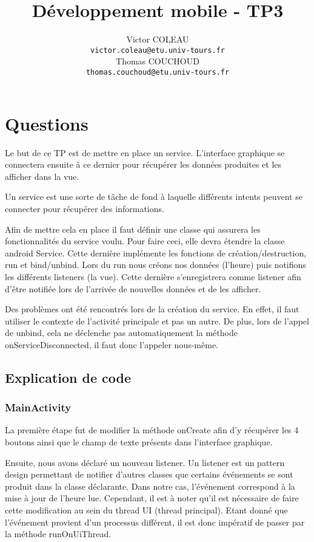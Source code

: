 \documentclass{report}
\title{Développement mobile - TP3}
\author{Victor COLEAU\\\texttt{victor.coleau@etu.univ-tours.fr}\\Thomas COUCHOUD\\\texttt{thomas.couchoud@etu.univ-tours.fr}}
\begin{document}
	\mccTitle
	
	\chapter{Questions}
		Le but de ce TP est de mettre en place un service. 
		L'interface graphique se connectera ensuite à ce dernier pour récupérer les données produites et les afficher dans la vue.
		
		Un service est une sorte de tâche de fond à laquelle différents intents peuvent se connecter pour récupérer des informations.
		
		Afin de mettre cela en place il faut définir une classe qui assurera les fonctionnalités du service voulu. 
		Pour faire ceci, elle devra étendre la classe android Service.
		Cette dernière implémente les fonctions de création/destruction, run et bind/unbind.
		Lors du run nous créons nos données (l'heure) puis notifions les différents listeners (la vue).
		Cette dernière s'enregistrera comme listener afin d'être notifiée lors de l'arrivée de nouvelles données et de les afficher.
		
		Des problèmes ont été rencontrés lors de la création du service.
		En effet, il faut utiliser le contexte de l'activité principale et pas un autre.
		De plus, lors de l'appel de unbind, cela ne déclenche pas automatiquement la méthode onServiceDisconnected, il faut donc l'appeler nous-même.

	\section{Explication de code}
		\subsection{MainActivity}
			La première étape fut de modifier la méthode onCreate afin d'y récupérer les 4 boutons ainsi que le champ de texte présents dans l'interface graphique.
	
			Ensuite, nous avons déclaré un nouveau listener.
			Un listener est un pattern design permettant de notifier d'autres classes que certains événements se sont produit dans la classe déclarante.
			Dans notre cas, l'événement correspond à la mise à jour de l'heure lue.
			Cependant, il est à noter qu'il est nécessaire de faire cette modification au sein du thread UI (thread principal).
			Etant donné que l'événement provient d'un processus différent, il est donc impératif de passer par la méthode runOnUiThread.
	
\end{document}
